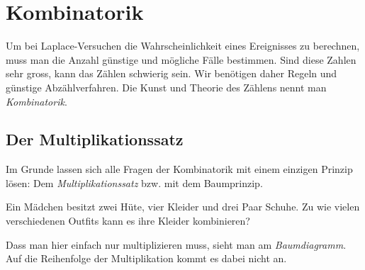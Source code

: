 \section{Kombinatorik}
\label{sec:Kombinatorik}
Um bei Laplace-Versuchen die Wahrscheinlichkeit eines Ereignisses zu berechnen, muss man die Anzahl günstige und mögliche Fälle bestimmen. Sind diese Zahlen sehr gross, kann das Zählen schwierig sein. Wir benötigen daher Regeln und günstige Abzählverfahren. Die Kunst und Theorie des Zählens nennt man \emph{Kombinatorik}.

\subsection{Der Multiplikationssatz}

Im Grunde lassen sich alle Fragen der Kombinatorik mit einem einzigen Prinzip lösen: Dem \emph{Multiplikationssatz} bzw. mit dem Baumprinzip.

Ein Mädchen besitzt zwei Hüte, vier Kleider und drei Paar Schuhe. Zu wie vielen verschiedenen Outfits kann es ihre Kleider kombinieren?

Dass man hier einfach nur multiplizieren muss, sieht man am \emph{Baumdiagramm}. Auf die Reihenfolge der Multiplikation kommt es dabei nicht an.

